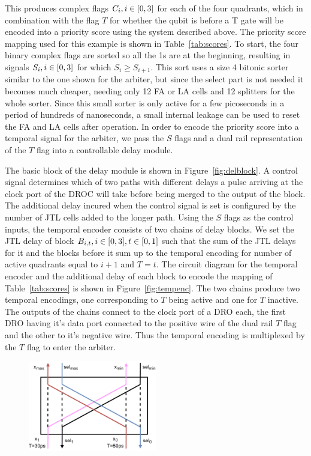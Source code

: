 \documentclass[conference]{IEEEtran}
\begin{document}
This produces complex flags $C_i, i \in \interval{0}{3}$ for each of the four quadrants, which in combination with the flag $T$ for whether the qubit is before a T gate will be encoded into a priority score using the system described above.
The priority score mapping used for this example is shown in Table~\ref{tab:scores}.
To start, the four binary complex flags are sorted so all the 1s are at the beginning, resulting in signals $S_i, i \in \interval{0}{3}$ for which $S_{i} \ge S_{i+1}$.
This sort uses a size 4 bitonic sorter similar to the one shown for the arbiter, but since the select part is not needed it becomes much cheaper, needing only 12 FA or LA cells and 12 splitters for the whole sorter.
Since this small sorter is only active for a few picoseconds in a period of hundreds of nanoseconds, a small internal leakage can be used to reset the FA and LA cells after operation.
In order to encode the priority score into a temporal signal for the arbiter, we pass the $S$ flags and a dual rail representation of the $T$ flag into a controllable delay module.

The basic block of the delay module is shown in Figure~\ref{fig:delblock}.
A control signal determines which of two paths with different delays a pulse arriving at the clock port of the DROC will take before being merged to the output of the block.
The additional delay incured when the control signal is set is configured by the number of JTL cells added to the longer path.
Using the $S$ flags as the control inputs, the temporal encoder consists of two chains of delay blocks.
We set the JTL delay of block $B_{i,t}, i \in \interval{0}{3}, t \in \interval{0}{1}$ such that the sum of the JTL delays for it and the blocks before it sum up to the temporal encoding for number of active quadrants equal to $i+1$ and $T = t$.
The circuit diagram for the temporal encoder and the additional delay of each block to encode the mapping of Table~\ref{tab:scores} is shown in Figure~\ref{fig:tempenc}.
The two chains produce two temporal encodings, one corresponding to $T$ being active and one for $T$ inactive.
The outputs of the chains connect to the clock port of a DRO each, the first DRO having it's data port connected to the positive wire of the dual rail $T$ flag and the other to it's negative wire.
Thus the temporal encoding is multiplexed by the $T$ flag to enter the arbiter.

\begin{figure}[h!]
  \includegraphics[width=0.5\textwidth]{figures/comparator.drawio.pdf}
  \caption{}
  \label{fig:comp}
\end{figure}
\end{document}
